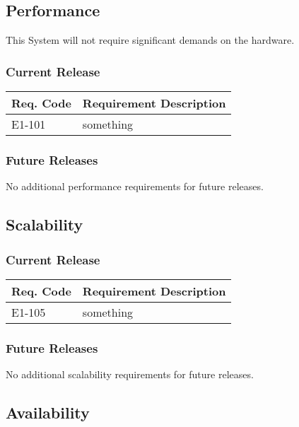 \documentclass[12pt]{article}
\begin{document}
\subsection{Performance}
This System will not require significant demands on the hardware.

\subsubsection{Current Release}

\begin{table}[!h]
	\begin{tabular}{| l | l |}
		\hline
		\textbf{Req. Code} & \textbf{Requirement Description}\\
		\hline
		E1-101	& something\\
		\hline
	\end{tabular}
	\label{tab:PerformanceRequirements}
\end{table}

\subsubsection{Future Releases}
No additional performance requirements for future releases.


\subsection{Scalability}

\subsubsection{Current Release}

\begin{table}[!h]
	\begin{tabular}{| l | l |}
		\hline
		\textbf{Req. Code} & \textbf{Requirement Description}\\
		\hline
		E1-105	& something\\
		\hline
	\end{tabular}
	\label{tab:ScalabilityRequirements}
\end{table}

\subsubsection{Future Releases}
No additional scalability requirements for future releases.


\subsection{Availability}
\end{document}
